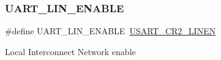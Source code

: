 \subsubsection{\texorpdfstring{UART\_LIN\_ENABLE}{UART\_LIN\_ENABLE}}
{\footnotesize\ttfamily \#define U\+A\+R\+T\+\_\+\+L\+I\+N\+\_\+\+E\+N\+A\+B\+LE~\mbox{\hyperlink{group___peripheral___registers___bits___definition_gac8931efa62c29d92f5c0ec5a05f907ef}{U\+S\+A\+R\+T\+\_\+\+C\+R2\+\_\+\+L\+I\+N\+EN}}}

Local Interconnect Network enable 